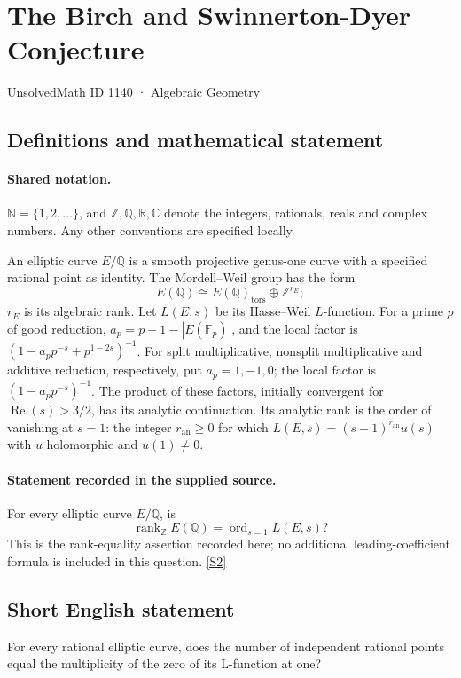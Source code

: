 \documentclass[11pt]{article}
\newcommand{\sref}[2]{\hyperlink{source:#1:#2}{[S#2]}}
\begin{document}
\setcounter{section}{1139}
\section{The Birch and Swinnerton-Dyer Conjecture}\label{1140}
{\small\sffamily UnsolvedMath ID 1140 · Algebraic Geometry}
\subsection{Definitions and mathematical statement}

\paragraph{Shared notation.}$\mathbb N=\{1,2,\ldots\}$, and $\mathbb Z,\mathbb Q,\mathbb R,\mathbb C$ denote the integers, rationals, reals and complex numbers. Any other conventions are specified locally.


An elliptic curve \(E/\mathbb Q\) is a smooth projective genus-one
curve with a specified rational point as identity.  The Mordell--Weil
group has the form
\[
 E(\mathbb Q)\cong E(\mathbb Q)_{\mathrm{tors}}\oplus\mathbb Z^{r_E};
\]
\(r_E\) is its algebraic rank.  Let \(L(E,s)\) be its Hasse--Weil
\(L\)-function.  For a prime \(p\) of good reduction,
\(a_p=p+1-|E(\mathbb F_p)|\), and the local factor is
\((1-a_pp^{-s}+p^{1-2s})^{-1}\).
For split multiplicative, nonsplit multiplicative and additive
reduction, respectively, put \(a_p=1,-1,0\); the local factor is
\((1-a_pp^{-s})^{-1}\).  The product of these factors, initially
convergent for \(\operatorname{Re}(s)>3/2\), has its analytic
continuation.  Its analytic rank is the order of vanishing at \(s=1\):
the integer \(r_{\mathrm{an}}\ge0\) for which
\(L(E,s)=(s-1)^{r_{\mathrm{an}}}u(s)\) with \(u\) holomorphic and
\(u(1)\ne0\).
\paragraph{Statement recorded in the supplied source.}
For every elliptic curve \(E/\mathbb Q\), is
\[
 \operatorname{rank}_{\mathbb Z}E(\mathbb Q)
       =\operatorname{ord}_{s=1}L(E,s)?
\]
This is the rank-equality assertion recorded here; no additional
leading-coefficient formula is included in this question. \sref{1140}{2}
\subsection{Short English statement}
For every rational elliptic curve, does the number of independent rational points equal the multiplicity of the zero of its L-function at one?
\end{document}
